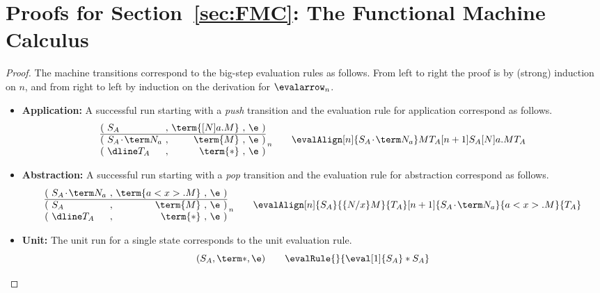 \documentclass[a4paper,UKenglish,cleveref, autoref, thm-restate]{lipics-v2021}
\newcommand\case[1]{\textbf{#1}}
\newcommand\msep{\kern1pt{\cdot}\kern1pt}
\begin{document}
\section{Proofs for Section~\ref{sec:FMC}: The Functional Machine Calculus}

\smallStepBigStep*

\begin{proof}
The machine transitions correspond to the big-step evaluation rules as follows. From left to right the proof is by (strong) induction on $n$, and from right to left by induction on the derivation for $\evalarrow_n$.

\begin{itemize}
\item\case{Application:}
A successful run starting with a \emph{push} transition and the evaluation rule for application correspond as follows.
\[
\begin{array}{@{(~}l@{~,~}r@{~,~}r@{~)}}
          S_A               & \term{[N]a.M} & \e
\\ \hline S_A\msep\term N_a &      \term{M} & \e
\\ \dline T_A               &      \term{*} & \e
\end{array}
\,\raisebox{-4pt}{$\scriptstyle n$}
\qquad
\evalAlign 
  [n]   {S_A\msep\term N_a}       M  {T_A}
  [n+1] {S_A}               {[N]a.M} {T_A}
\]

\item\case{Abstraction:}
A successful run starting with a \emph{pop} transition and the evaluation rule for abstraction correspond as follows.
\[
\begin{array}{@{(~}l@{~,~}r@{~,~}r@{~)}}
          S_A\msep\term N_a & \term{a<x>.M} & \e
\\ \hline S_A               &      \term{M} & \e
\\ \dline T_A               &      \term{*} & \e
\end{array}
\,\raisebox{-4pt}{$\scriptstyle n$}
\qquad  
\evalAlign 
  [n]   {S_A}             {\{N/x\}M} {T_A}
  [n+1] {S_A\msep\term N_a} {a<x>.M} {T_A}
\]

\item\case{Unit:}
The unit run for a single state corresponds to the unit evaluation rule.
\[
	(S_A,\term *,\e) \qquad \evalRule {} {\eval[1]{S_A}*{S_A}}
\]


\end{itemize}
\end{proof}
\end{document}
